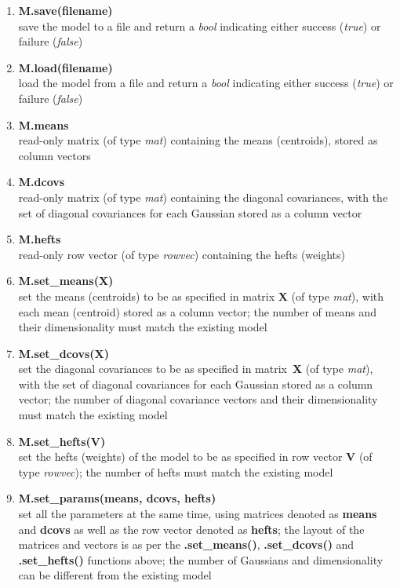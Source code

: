 \begin{enumerate}[{$\bullet$}]
\item
{\bf M.save(filename)}\\
save the model to a file and return a {\it bool} indicating either success ({\it true}) or failure ({\it false})

\item
{\bf M.load(filename)}\\
load the model from a file and return a {\it bool} indicating either success ({\it true}) or failure ({\it false})

\item
{\bf M.means}\\
read-only matrix (of type {\it mat}) containing the means (centroids), stored as column vectors

\item
{\bf M.dcovs}\\
read-only matrix (of type {\it mat}) containing the diagonal covariances, with the set of diagonal covariances for each Gaussian stored as a column vector

\item
{\bf M.hefts}\\
read-only row vector (of type {\it rowvec}) containing the hefts (weights)

\item
{\bf M.set\_means(X)}\\
set the means (centroids) to be as specified in matrix {\bf X} (of type {\it mat}), with each mean (centroid) stored as a column vector;
the number of means and their dimensionality must match the existing model

\item
{\bf M.set\_dcovs(X)}\\
set the diagonal covariances to be as specified in matrix~{\bf X} (of type {\it mat}), with the set of diagonal covariances for each Gaussian stored as a column vector;
the number of diagonal covariance vectors and their dimensionality must match the existing model

\item
{\bf M.set\_hefts(V)}\\
set the hefts (weights) of the model to be as specified in row vector {\bf V} (of type {\it rowvec});
the number of hefts must match the existing model

\item
{\bf M.set\_params(means, dcovs, hefts)}\\
set all the parameters at the same time, using matrices denoted as {\bf means} and {\bf dcovs} as well as the row vector denoted as {\bf hefts};
the layout of the matrices and vectors is as per the {\bf .set\_means()}, {\bf .set\_dcovs()} and {\bf .set\_hefts()} functions above;
the number of Gaussians and dimensionality can be different from the existing model

\end{enumerate}

